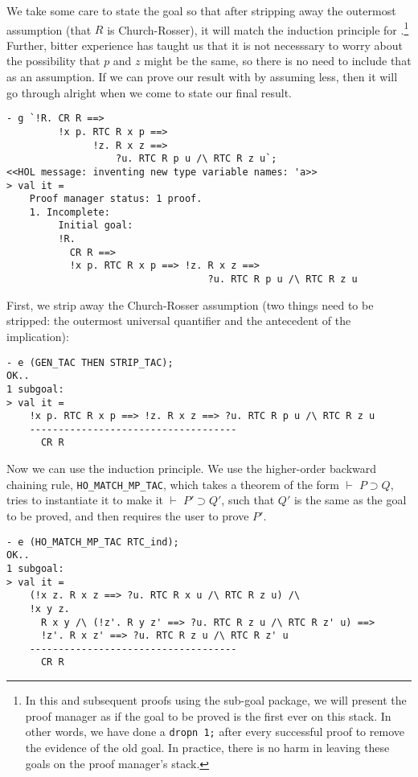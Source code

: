 \documentclass[12pt]{article}
\begin{document}
We take some care to state the goal so that after stripping away the
outermost assumption (that $R$ is Church-Rosser), it will match the
induction principle for .\footnote{In this and subsequent
  proofs using the sub-goal package, we will present the proof manager
  as if the goal to be proved is the first ever on this stack.  In
  other words, we have done a \texttt{dropn 1;} after every successful
  proof to remove the evidence of the old goal.  In practice, there is
  no harm in leaving these goals on the proof manager's stack.}
Further, bitter experience has taught us that it is not necesssary to
worry about the possibility that $p$ and $z$ might be the same, so
there is no need to include that as an assumption.  If we can prove
our result with by assuming less, then it will go through alright when
we come to state our final result.
\begin{session}\begin{verbatim}
- g `!R. CR R ==>
         !x p. RTC R x p ==>
               !z. R x z ==>
                   ?u. RTC R p u /\ RTC R z u`;
<<HOL message: inventing new type variable names: 'a>>
> val it =
    Proof manager status: 1 proof.
    1. Incomplete:
         Initial goal:
         !R.
           CR R ==>
           !x p. RTC R x p ==> !z. R x z ==>
                                   ?u. RTC R p u /\ RTC R z u
\end{verbatim}\end{session}
First, we strip away the Church-Rosser assumption (two things need to
be stripped: the outermost universal quantifier and the antecedent of
the implication):
\begin{session}\begin{verbatim}
- e (GEN_TAC THEN STRIP_TAC);
OK..
1 subgoal:
> val it =
    !x p. RTC R x p ==> !z. R x z ==> ?u. RTC R p u /\ RTC R z u
    ------------------------------------
      CR R
\end{verbatim}\end{session}
Now we can use the induction principle.  We use the higher-order
backward chaining rule, \texttt{HO\_MATCH\_MP\_TAC}, which takes a
theorem of the form $\vdash\;P\supset Q$, tries to instantiate it to
make it $\vdash\;P'\supset Q'$, such that $Q'$ is the same as the goal
to be proved, and then requires the user to prove $P'$.
\begin{session}\begin{verbatim}
- e (HO_MATCH_MP_TAC RTC_ind);
OK..
1 subgoal:
> val it =
    (!x z. R x z ==> ?u. RTC R x u /\ RTC R z u) /\
    !x y z.
      R x y /\ (!z'. R y z' ==> ?u. RTC R z u /\ RTC R z' u) ==>
      !z'. R x z' ==> ?u. RTC R z u /\ RTC R z' u
    ------------------------------------
      CR R
\end{verbatim}\end{session}
\end{document}
